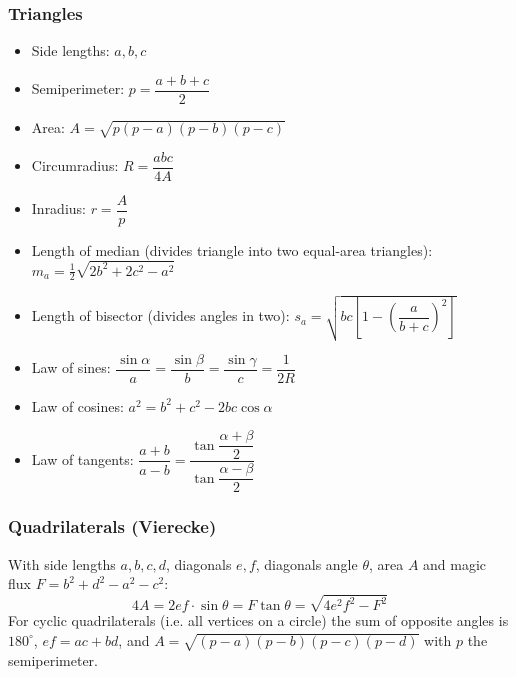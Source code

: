 
\subsubsection{Triangles}

\begin{itemize}
	\item Side lengths: $a,b,c$
	\item Semiperimeter: $p=\dfrac{a+b+c}{2}$
	\item Area: $A=\sqrt{p(p-a)(p-b)(p-c)}$
	\item Circumradius: $R=\dfrac{abc}{4A}$
	\item Inradius: $r=\dfrac{A}{p}$
	\item Length of median (divides triangle into two equal-area triangles): $m_a=\tfrac{1}{2}\sqrt{2b^2+2c^2-a^2}$
	\item Length of bisector (divides angles in two): $s_a=\sqrt{bc\left[1-\left(\dfrac{a}{b+c}\right)^2\right]}$
	\item Law of sines: $\dfrac{\sin\alpha}{a}=\dfrac{\sin\beta}{b}=\dfrac{\sin\gamma}{c}=\dfrac{1}{2R}$
	\item Law of cosines: $a^2=b^2+c^2-2bc\cos\alpha$
	\item Law of tangents: $\dfrac{a+b}{a-b}=\dfrac{\tan\dfrac{\alpha+\beta}{2}}{\tan\dfrac{\alpha-\beta}{2}}$
\end{itemize}

\subsubsection{Quadrilaterals (Vierecke)}
With side lengths $a,b,c,d$, diagonals $e, f$, diagonals angle $\theta$, area $A$ and magic flux $F=b^2+d^2-a^2-c^2$:
\begin{equation*}
	4A = 2ef \cdot \sin\theta = F\tan\theta = \sqrt{4e^2f^2-F^2} 
\end{equation*}
For cyclic quadrilaterals (i.e. all vertices on a circle) the sum of opposite angles is $180^\circ$, $ef = ac + bd$, and $A = \sqrt{(p-a)(p-b)(p-c)(p-d)}$ with $p$ the semiperimeter.